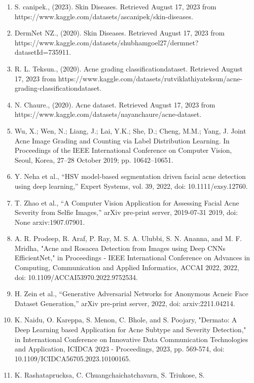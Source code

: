 \documentclass[16pt]{extarticle}
\begin{document}
\begin{enumerate}
\item
  S. canipek., (2023). Skin Diseases. Retrieved August 17, 2023 from
  https://www.kaggle.com/datasets/ascanipek/skin-diseases.
\item
  DermNet NZ., (2020). Skin Diseases. Retrieved August 17, 2023 from
  https://www.kaggle.com/datasets/shubhamgoel27/dermnet?datasetId=735911.
\item
  R. L. Teksun., (2020). Acne grading classificationdataset. Retrieved
  August 17, 2023 from
  https://www.kaggle.com/datasets/rutviklathiyateksun/acne-grading-classificationdataset.
\item
  N. Chaure., (2020). Acne dataset. Retrieved August 17, 2023 from
  https://www.kaggle.com/datasets/nayanchaure/acne-dataset.
\item
  Wu, X.; Wen, N.; Liang, J.; Lai, Y.K.; She, D.; Cheng, M.M.; Yang, J.
  Joint Acne Image Grading and Counting via Label Distribution Learning.
  In Proceedings of the IEEE International Conference on Computer
  Vision, Seoul, Korea, 27--28 October 2019; pp. 10642--10651.
\item
  Y. Neha et al., ``HSV model-based segmentation driven facial acne
  detection using deep learning,'' Expert Systems, vol. 39, 2022, doi:
  10.1111/exsy.12760.
\item
  T. Zhao et al., ``A Computer Vision Application for Assessing Facial
  Acne Severity from Selfie Images,'' arXiv pre-print server, 2019-07-31
  2019, doi: None arxiv:1907.07901.
\item
  A. R. Prodeep, R. Araf, P. Ray, M. S. A. Ulubbi, S. N. Ananna, and M.
  F. Mridha, "Acne and Rosacea Detection from Images using Deep
  CNN\textquotesingle s EfficientNet," in Proceedings - IEEE
  International Conference on Advances in Computing, Communication and
  Applied Informatics, ACCAI 2022, 2022, doi:
  10.1109/ACCAI53970.2022.9752534.
\item
  H. Zein et al., ``Generative Adversarial Networks for Anonymous Acneic
  Face Dataset Generation,'' arXiv pre-print server, 2022, doi:
  arxiv:2211.04214.
\item
  K. Naidu, O. Kareppa, S. Menon, C. Bhole, and S. Poojary, "Dermato: A
  Deep Learning based Application for Acne Subtype and Severity
  Detection," in International Conference on Innovative Data
  Communication Technologies and Application, ICIDCA 2023 - Proceedings,
  2023, pp. 569-574, doi: 10.1109/ICIDCA56705.2023.10100165.
\item
  K. Rashataprucksa, C. Chuangchaichatchavarn, S. Triukose, S.

\end{enumerate}
\end{document}
